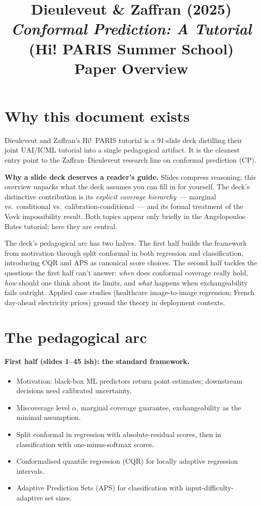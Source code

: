 \documentclass[letterpaper,11pt,leqno]{article}
\title{Dieuleveut \& Zaffran (2025)\\\textit{Conformal Prediction: A Tutorial} (Hi! PARIS Summer School)\\[2pt]\large Paper Overview}
\author{}
\date{}
\begin{document}
\maketitle

\section{Why this document exists}\label{s:intro}

Dieuleveut and Zaffran's Hi!~PARIS tutorial \cite{dieuleveut2025tutorial} is a 91-slide deck distilling their joint UAI/ICML tutorial into a single pedagogical artifact. It is the cleanest entry point to the Zaffran--Dieuleveut research line on conformal prediction (CP).

\begin{keyinsight}
\textbf{Why a slide deck deserves a reader's guide.} Slides compress reasoning; this overview unpacks what the deck assumes you can fill in for yourself. The deck's distinctive contribution is its \emph{explicit coverage hierarchy}~--- marginal vs.~conditional vs.~calibration-conditional~--- and its formal treatment of the Vovk impossibility result. Both topics appear only briefly in the Angelopoulos--Bates tutorial; here they are central.
\end{keyinsight}

The deck's pedagogical arc has two halves. The first half builds the framework from motivation through split conformal in both regression and classification, introducing CQR and APS as canonical score choices. The second half tackles the questions the first half can't answer: \emph{when} does conformal coverage really hold, \emph{how} should one think about its limits, and \emph{what} happens when exchangeability fails outright. Applied case studies (healthcare image-to-image regression; French day-ahead electricity prices) ground the theory in deployment contexts.

\section{The pedagogical arc}\label{s:arc}

\paragraph{First half (slides 1--45 ish): the standard framework.}
\begin{itemize}
\item Motivation: black-box ML predictors return point estimates; downstream decisions need calibrated uncertainty.
\item Miscoverage level $\alpha$, marginal coverage guarantee, exchangeability as the minimal assumption.
\item Split conformal in regression with absolute-residual scores, then in classification with one-minus-softmax scores.
\item Conformalised quantile regression (CQR) for locally adaptive regression intervals.
\item Adaptive Prediction Sets (APS) for classification with input-difficulty-adaptive set sizes.
\end{itemize}
\end{document}
